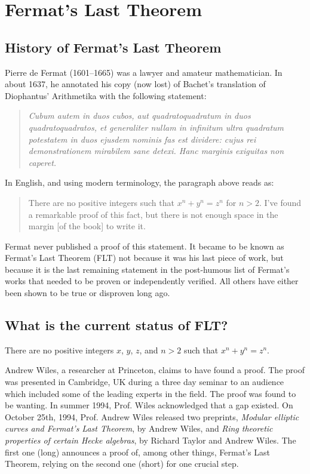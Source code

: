 \section{Fermat's Last Theorem}

\subsection{History of Fermat's Last Theorem}

Pierre de Fermat (1601--1665) was a lawyer and amateur mathematician. In
about 1637, he annotated his copy (now lost) of Bachet's translation of
Diophantus' Arithmetika with the following statement:

\begin{quote}
  \emph{Cubum autem in duos cubos, aut quadratoquadratum in duos
    quadratoquadratos, et generaliter nullam in infinitum ultra
    quadratum potestatem in duos ejusdem nominis fas est dividere: cujus
    rei demonstrationem mirabilem sane detexi. Hanc marginis exiguitas
    non caperet.}
\end{quote}

In English, and using modern terminology, the paragraph above reads as:
\begin{quote}
  There are no positive integers such that $x^n + y^n = z^n$ for $n>2$.
  I've found a remarkable proof of this fact, but there is not enough
  space in the margin [of the book] to write it.
\end{quote}

Fermat never published a proof of this statement. It became to be known
as Fermat's Last Theorem (FLT) not because it was his last piece of
work, but because it is the last remaining statement in the post-humous
list of Fermat's works that needed to be proven or independently
verified. All others have either been shown to be true or disproven long
ago.


\subsection{What is the current status of FLT?}

\bigskip

\begin{teo}
  There are no positive integers $x$, $y$, $z$, and $n > 2$ such that
  $x^n + y^n = z^n$.
\end{teo}

Andrew Wiles, a researcher at Princeton, claims to have found a proof.
The proof was presented in Cambridge, UK during a three day seminar to
an audience which included some of the leading experts in the field.
The proof was found to be wanting.  In summer 1994, Prof. Wiles
acknowledged that a gap existed. On October 25th, 1994, Prof. Andrew
Wiles released two preprints, \emph{Modular elliptic curves and Fermat's
  Last Theorem}, by Andrew Wiles, and \emph{Ring theoretic properties of
  certain Hecke algebras}, by Richard Taylor and Andrew Wiles.  The
first one (long) announces a proof of, among other things, Fermat's Last
Theorem, relying on the second one (short) for one crucial step.

